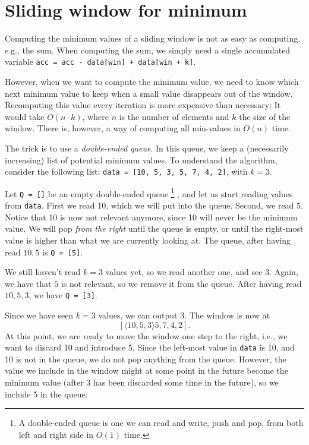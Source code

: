 \documentclass[a4paper,12pt]{article}
\begin{document}
\section*{Sliding window for minimum}

Computing the minimum values of a sliding window is not as easy as computing,
e.g., the sum.  When computing the sum, we simply need a single accumulated
variable \texttt{acc = acc - data[win] + data[win + k]}.

However, when we want to compute the minimum value, we need to know which next
minimum value to keep when a small value disappears out of the window.
%
Recomputing this value every iteration is more expensive than necessary; It
would take $O(n \cdot k)$, where $n$ is the number of elements and $k$ the size
of the window.  There is, however, a way of computing all min-values in $O(n)$
time.

The trick is to use a \emph{double-ended queue}.  In this queue, we keep a
(necessarily increasing) list of potential minimum values.  To understand the
algorithm, consider the following list: \texttt{data = [10, 5, 3, 5, 7, 4, 2]}, with $k = 3$.

Let \texttt{Q = []} be an empty double-ended queue%
\footnote{A double-ended queue is one we can read and write, push and pop, from both left and right side in $O(1)$ time.}%
, and let us start reading values from \texttt{data}.
%
First we read 10, which we will put into the queue.  Second, we read 5.  Notice
that 10 is now not relevant anymore, since 10 will never be the minimum value.
We will pop \emph{from the right} until the queue is empty, or until the
right-most value is higher than what we are currently looking at.  The queue,
after having read $10, 5$ is \texttt{Q = [5]}.

We still haven't read $k=3$ values yet, so we read another one, and see 3.
Again, we have that $5$ is not relevant, so we remove it from the queue.  After
having read $10, 5, 3$, we have \texttt{Q = [3]}.

Since we have seen $k=3$ values, we can output $3$.  The window is now
at $$[\langle 10, 5, 3 \rangle 5, 7, 4, 2].$$ At this point, we are ready to
move the window one step to the right, i.e., we want to discard 10 and
introduce 5.  Since the left-most value in \texttt{data} is 10, and
10 is not in the queue, we do not pop anything from the queue.  However, the
value we include in the window might at some point in the future become the
minimum value (after 3 has been discarded some time in the future), so we
include 5 in the queue.
\end{document}
